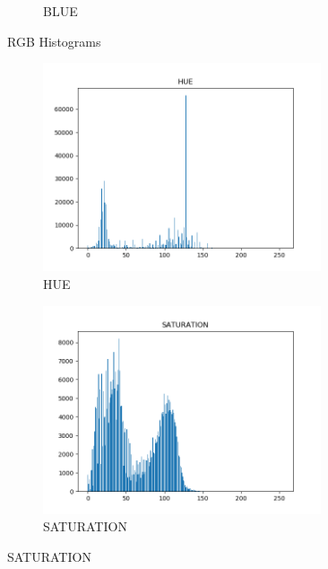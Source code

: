 \documentclass[11pt]{report}
\begin{document}
\begin{figure}[H]
\begin{subfigure}{0.4\textwidth}
        \caption{BLUE}
        \label{fig:blue_hist}
    \end{subfigure}
    \caption{RGB Histograms}
    \label{fig:rgb_all_hist}
\end{figure}

\begin{figure}[H]
    \centering
    \begin{subfigure}{0.4\textwidth}
        \centering
        \includegraphics[width=0.9\textwidth]{Task 1 Plots/histogram_HUE.png}
        \caption{HUE}
        \label{fig:hue_hist}
    \end{subfigure}
    \begin{subfigure}{0.4\textwidth}
        \centering
        \includegraphics[width=0.9\textwidth]{Task 1 Plots/histogram_SATURATION.png}
        \caption{SATURATION}
        \label{fig:saturation_hist}
    \end{subfigure}

\end{figure}
\end{document}
